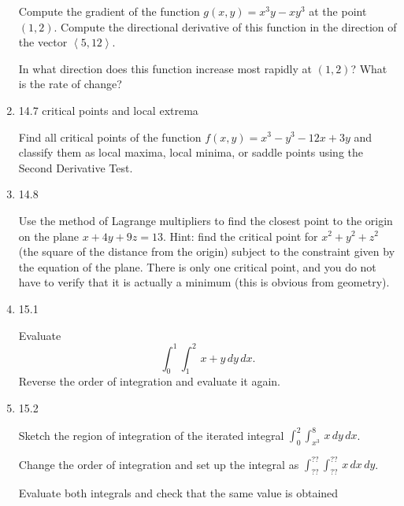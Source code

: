 \documentclass[12pt]{article}
\begin{document}
\begin{enumerate}
Compute the gradient of the function $g(x,y) = x^3y-xy^3$ at the point $(1,2)$.  Compute the directional derivative of this function in the direction of the vector $\left<5,12\right>$.

\vspace{1.5 in}

In what direction does this function increase most rapidly at $(1,2)$?  What is the rate of change?

\newpage


\item  14.7  critical points and local extrema

Find all critical points of the function $f(x,y) = x^3-y^3-12x+3y$ and classify them as local maxima, local minima, or saddle points using the Second Derivative Test.

\newpage

\item 14.8

Use the method of Lagrange multipliers to find the closest point
to the origin on the plane $x+4y+9z=13$.  Hint: find the critical point
for $x^2+y^2+z^2$ (the square of the distance from the origin) subject
to the constraint given by the equation of the plane.  There is only
one critical point, and you do not have to verify that it is actually
a minimum (this is obvious from geometry).

\newpage 

\item  15.1  

Evaluate $$\int_0^1\int_1^2\,x+y\,dy\,dx.$$   Reverse the order of integration and evaluate it again.

\newpage 


\newpage

\item  15.2

  Sketch the region of integration of the iterated integral $\int_0^2\int_{x^3}^8 \, x \,dy\,dx$.

\vspace{1.5 in}

Change the order of integration and set up the integral as $\int_{??}^{??} \int_{??}^{??}\,x\,dx\,dy$.

\vspace{1.5 in}

Evaluate both integrals and check that the same value is obtained

\newpage











\newpage











\end{enumerate}
\end{document}
